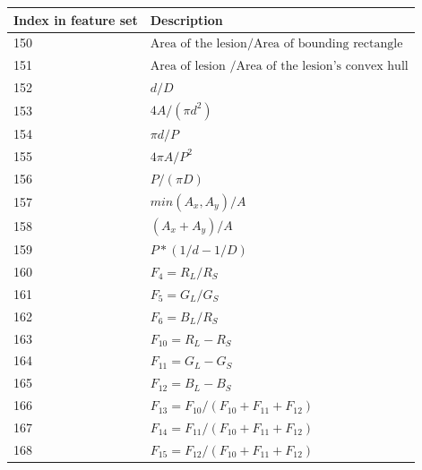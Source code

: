 \documentclass{kththesis}
\begin{document}
\begin{table}[]
  \begin{tabular}{|l|l|}
  \hline
  Index in feature set & Description \\ \hline
  150                  &    \( \textrm{Area of the lesion} / \textrm{Area of bounding rectangle} \)        \\ \hline
  151                  &       \( \textrm{Area of lesion } / \textrm{Area of the lesion's convex hull} \)      \\ \hline
  152                  &      \(d / D\)       \\ \hline
  153                  &       \(4A/  (\pi d^2)  \)      \\ \hline
  154                  &       \(\pi d /P\)      \\ \hline
  155                  &       \(4\pi A/P^2\)      \\ \hline
  156                  &       \(P/(\pi D)\)      \\ \hline
  157                  &       \(min(A_x , A_y) /A\)      \\ \hline
  158                  &       \((A_x + A_y)/A\)      \\ \hline
  159                  &       \(P*(1/d - 1/D)\)      \\ \hline
  160                  &       \(F_4 = R_L /R_S\)      \\ \hline
  161                  &       \(F_5 = G_L / G_S\)      \\ \hline
  162                  &       \(F_6 = B_L / R_S\)      \\ \hline
  163                  &       \(F_{10} = R_L - R_S\)      \\ \hline
  164                  &       \(F_{11} = G_L - G_S\)      \\ \hline
  165                  &       \(F_{12} =B_L - B_S\)      \\ \hline
  166                  &       \(F_{13} =F_{10} / (F_{10} + F_{11} + F_{12})\)      \\ \hline
  167                  &       \(F_{14} =F_{11} / (F_{10} + F_{11} + F_{12})\)      \\ \hline
  168                  &       \(F_{15} =F_{12} / (F_{10} + F_{11} + F_{12})\)      \\ \hline
  \end{tabular}
  \label{feature_description}
  \end{table}
\end{document}
